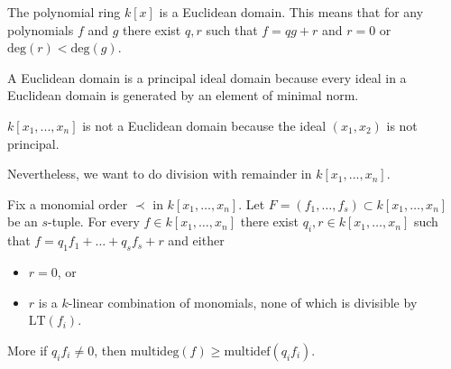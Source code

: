 \documentclass[a4paper, 11pt]{article}
\begin{document}

\begin{remark}
  The polynomial ring \( k[x] \) is a Euclidean domain. This means that for any polynomials \( f \) and \( g \) there exist \( q,r \) such that \(  f = qg + r \) and \( r = 0 \) or \( \mathrm{deg}(r) < \mathrm{deg}(g) \).
\end{remark}

\begin{remark}
  A Euclidean domain is a principal ideal domain because every ideal in a Euclidean domain is generated by an element of minimal norm.
\end{remark}

\begin{remark}
  \( k[x_1,...,x_n] \) is not a Euclidean domain because the ideal \( (x_1,x_2) \) is not principal.
\end{remark}

Nevertheless, we want to do division with remainder in \( k[x_1,...,x_n] \).

\begin{prop}
  Fix a monomial order \( \prec \) in \( k[x_1,\dots,x_n] \). Let \( F=(f_1,\dots,f_s) \subset  k[x_1,\dots,x_n] \) be an \( s \)-tuple. For every \( f \in k[x_1,\dots,x_n] \) there exist \( q_i, r \in k[x_1,\dots,x_n] \) such that \(  f = q_1f_1 + \dots + q_sf_s + r \) and either
  \begin{itemize}
    \item \( r = 0 \), or
    \item \( r \) is a \( k \)-linear combination of monomials, none of which is divisible by \( \mathrm{LT}(f_i) \).
  \end{itemize}
  More if \( q_if_i \neq 0 \), then \(     \mathrm{multideg}(f) \geq \mathrm{multidef}(q_if_i)
  \).
\end{prop}
\end{document}
